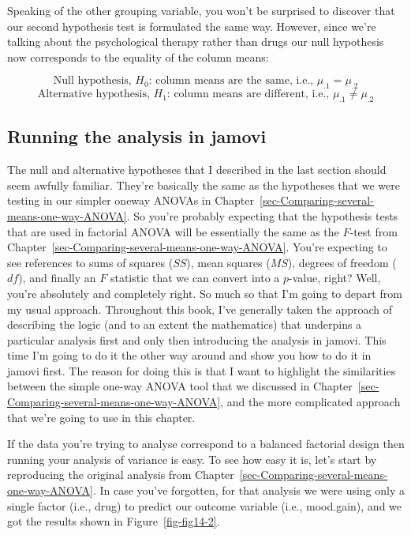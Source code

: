 \documentclass[
  a4paper,
]{book}
\begin{document}
Speaking of the other grouping variable, you won't be surprised to
discover that our second hypothesis test is formulated the same way.
However, since we're talking about the psychological therapy rather than
drugs our null hypothesis now corresponds to the equality of the column
means:

\[\text{Null hypothesis, } H_0 \text{: column means are the same, i.e., } \mu_{ .1} = \mu_{ .2} \]
\[\text{Alternative hypothesis, } H_1 \text{: column means are different, i.e., } \mu_{ .1} \neq \mu_{ .2}\]

\hypertarget{running-the-analysis-in-jamovi}{%
\subsection{Running the analysis in
jamovi}\label{running-the-analysis-in-jamovi}}

The null and alternative hypotheses that I described in the last section
should seem awfully familiar. They're basically the same as the
hypotheses that we were testing in our simpler oneway ANOVAs in
Chapter~\ref{sec-Comparing-several-means-one-way-ANOVA}. So you're
probably expecting that the hypothesis tests that are used in factorial
ANOVA will be essentially the same as the \(F\)-test from
Chapter~\ref{sec-Comparing-several-means-one-way-ANOVA}. You're
expecting to see references to sums of squares (\(SS\)), mean squares
(\(MS\)), degrees of freedom (\(df\)), and finally an \(F\) statistic
that we can convert into a \(p\)-value, right? Well, you're absolutely
and completely right. So much so that I'm going to depart from my usual
approach. Throughout this book, I've generally taken the approach of
describing the logic (and to an extent the mathematics) that underpins a
particular analysis first and only then introducing the analysis in
jamovi. This time I'm going to do it the other way around and show you
how to do it in jamovi first. The reason for doing this is that I want
to highlight the similarities between the simple one-way ANOVA tool that
we discussed in Chapter~\ref{sec-Comparing-several-means-one-way-ANOVA},
and the more complicated approach that we're going to use in this
chapter.

If the data you're trying to analyse correspond to a balanced factorial
design then running your analysis of variance is easy. To see how easy
it is, let's start by reproducing the original analysis from
Chapter~\ref{sec-Comparing-several-means-one-way-ANOVA}. In case you've
forgotten, for that analysis we were using only a single factor (i.e.,
drug) to predict our outcome variable (i.e., mood.gain), and we got the
results shown in Figure~\ref{fig-fig14-2}.
\end{document}
